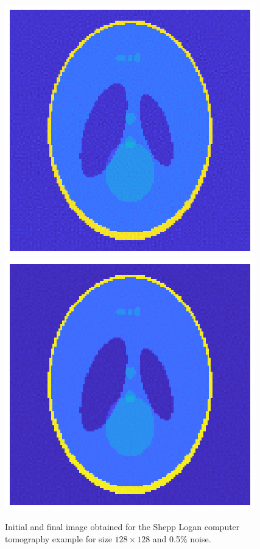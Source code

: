 \begin{figure}[htbp]
\begin{center}
\includegraphics{figures/full_angle_initial}\includegraphics{figures/full_angle_final}
\caption{Initial and final image obtained for the Shepp Logan computer tomography example for size $128 \times 128$ and 0.5\% noise.}
\label{fig:full_angle_initial_and_final}
\end{center}
\end{figure}%

